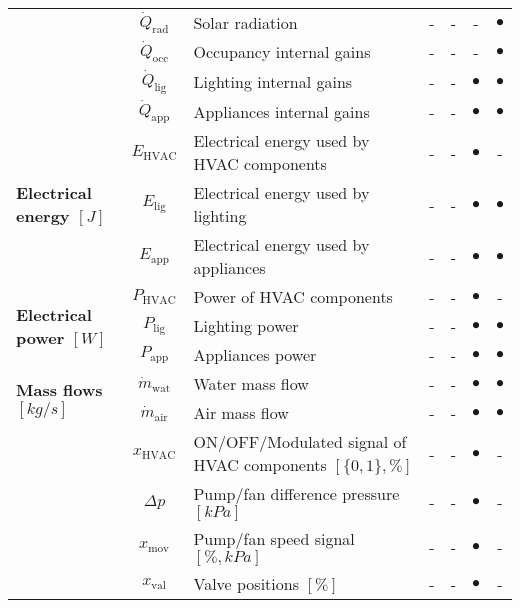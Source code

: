 \documentclass[10pt]{extarticle}
\begin{document}
\begin{table}[ht]
\begin{adjustwidth}{-1cm}{}
\begin{tabular}{l|c|l|cccc}
		& $\dot{Q}_{\text{rad}}$ & Solar radiation & - & - & - & $\bullet$  \\
		& $\dot{Q}_{\text{occ}}$ & Occupancy internal gains & - & - & - & $\bullet$  \\
		& $\dot{Q}_{\text{lig}}$ & Lighting internal gains & - & - & $\bullet$ & $\bullet$  \\
		& $\dot{Q}_{\text{app}}$ & Appliances internal gains & - & - & $\bullet$ & $\bullet$  \\
		\midrule
		\multirow{3}{*}{\textbf{Electrical energy $[J]$}} 
		& $E_{\text{HVAC}}$ & Electrical energy used by HVAC components & - & - &  $\bullet$ &- \\
		& $E_{\text{lig}}$ & Electrical energy used by lighting & - & - & $\bullet$ & $\bullet$ \\
		& $E_{\text{app}}$ & Electrical energy used by appliances & - & - & $\bullet$ & $\bullet$ \\
		\midrule
		\multirow{3}{*}{\textbf{Electrical power $[W]$}} 
		& $P_{\text{HVAC}}$ & Power of HVAC components & - & - &  $\bullet$ &- \\
		& $P_{\text{lig}}$ & Lighting power & - & - & $\bullet$ & $\bullet$ \\
		& $P_{\text{app}}$ & Appliances power & - & - & $\bullet$ & $\bullet$ \\
\midrule
		\multirow{2}{*}{\textbf{Mass flows $[kg/s]$}} &
		$\dot{m}_{\text{wat}}$ & Water mass flow & - & - & $\bullet$ &  $\bullet$ \\
		& $\dot{m}_{\text{air}}$ & Air mass flow & - & - & $\bullet$ &  $\bullet$ \\
		\midrule
		\multirow{5}{*}{\textbf{\shortstack[l]{Component signals }}} 
		& $x_{\text{HVAC}}$ & ON/OFF/Modulated signal of HVAC components $[\{0,1\},\%]$ & - & - & $\bullet$ & - \\
		& $\Delta p$ & Pump/fan difference pressure $[kPa]$ & - & - & $\bullet$ & - \\
		& $x_{\text{mov}}$ & Pump/fan speed signal $[\%,kPa]$ & - & - & $\bullet$ & - \\
		& $x_{\text{val}}$ & Valve positions $[\%]$ & - & - & $\bullet$ & - \\

\end{tabular}
\end{adjustwidth}
\end{table}
\end{document}
